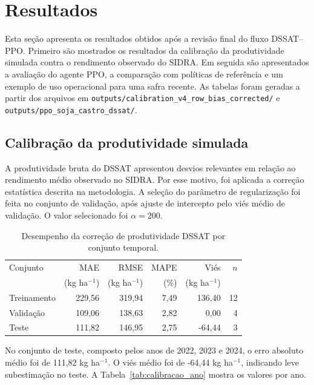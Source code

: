 \section{Resultados}
\label{sec:resultados}

Esta seção apresenta os resultados obtidos após a revisão final do fluxo
DSSAT--PPO. Primeiro são mostrados os resultados da calibração da produtividade
simulada contra o rendimento observado do SIDRA. Em seguida são apresentados a
avaliação do agente PPO, a comparação com políticas de referência e um exemplo de
uso operacional para uma safra recente. As tabelas foram geradas a partir dos
arquivos em \texttt{outputs/calibration\_v4\_row\_bias\_corrected/} e
\texttt{outputs/ppo\_soja\_castro\_dssat/}.

\subsection{Calibração da produtividade simulada}
\label{subsec:resultados_calibracao}

A produtividade bruta do DSSAT apresentou desvios relevantes em relação ao
rendimento médio observado no SIDRA. Por esse motivo, foi aplicada a correção
estatística descrita na metodologia. A seleção do parâmetro de regularização foi
feita no conjunto de validação, após ajuste de intercepto pelo viés médio de
validação. O valor selecionado foi $\alpha = 200$.

\begin{table}[htbp]
\centering
\caption{Desempenho da correção de produtividade DSSAT por conjunto temporal.}
\label{tab:metricas_calibracao}
\begin{tabular}{lrrrrr}
\hline
Conjunto & MAE & RMSE & MAPE & Viés & $n$ \\
         & (kg ha$^{-1}$) & (kg ha$^{-1}$) & (\%) & (kg ha$^{-1}$) & \\
\hline
Treinamento & 229,56 & 319,94 & 7,49 & 136,40 & 12 \\
Validação   & 109,06 & 138,63 & 2,82 & 0,00   & 4  \\
Teste       & 111,82 & 146,95 & 2,75 & -64,44 & 3  \\
\hline
\end{tabular}
\end{table}

No conjunto de teste, composto pelos anos de 2022, 2023 e 2024, o erro absoluto
médio foi de 111,82 kg ha$^{-1}$. O viés médio foi de -64,44 kg ha$^{-1}$,
indicando leve subestimação no teste. A Tabela~\ref{tab:calibracao_ano} mostra
os valores por ano.

